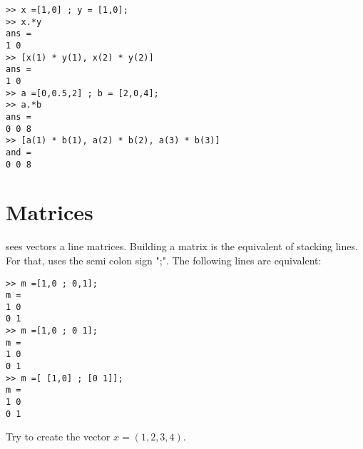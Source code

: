 \begin{lstlisting}
>> x =[1,0] ; y = [1,0];
>> x.*y
ans = 
1 0
>> [x(1) * y(1), x(2) * y(2)]
ans =
1 0
>> a =[0,0.5,2] ; b = [2,0,4];
>> a.*b
ans = 
0 0 8
>> [a(1) * b(1), a(2) * b(2), a(3) * b(3)]
and =
0 0 8
\end{lstlisting}





\section{Matrices}
\matlab sees vectors a line matrices. Building a matrix is the equivalent of stacking lines.
For that, \matlab uses the semi colon sign ";".
The following lines are equivalent:
\begin{lstlisting}
>> m =[1,0 ; 0,1];
m = 
1 0
0 1
>> m =[1,0 ; 0 1];
m = 
1 0
0 1
>> m =[ [1,0] ; [0 1]];
m = 
1 0
0 1
\end{lstlisting}




Try to create the vector $x = (1,2,3,4)$.






